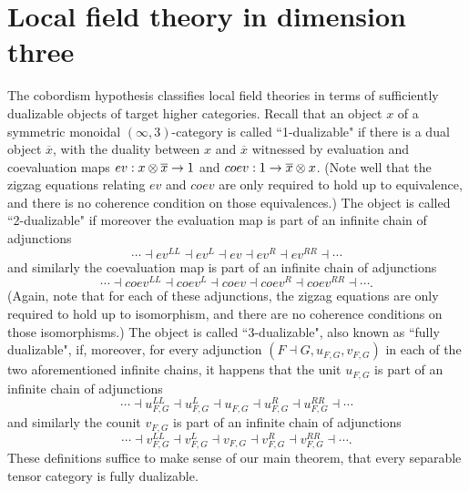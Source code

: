 \documentclass{amsart}
\begin{document}

\section{Local field theory in dimension three} \label{sec:lft}



The cobordism hypothesis \cite{MR1355899, lurie-ch} classifies local field theories in terms of sufficiently dualizable objects of target higher categories.  Recall that an object $x$ of a symmetric monoidal $(\infty,3)$-category is called ``1-dualizable" if there is a dual object $\overline{x}$, with the duality between $x$ and $\overline{x}$ witnessed by evaluation and coevaluation maps $ev: x \otimes \overline{x} \rightarrow 1$ and $coev: 1 \rightarrow \overline{x} \otimes x$.  (Note well that the zigzag equations relating $ev$ and $coev$ are only required to hold up to equivalence, and there is no coherence condition on those equivalences.)  The object is called ``2-dualizable" if moreover the evaluation map is part of an infinite chain of adjunctions 
$$\cdots \dashv ev^{LL} \dashv ev^L \dashv ev \dashv ev^R \dashv ev^{RR} \dashv \cdots$$
and similarly the coevaluation map is part of an infinite chain of adjunctions 
$$\cdots \dashv coev^{LL} \dashv coev^L \dashv coev \dashv coev^R \dashv coev^{RR} \dashv \cdots.$$  
(Again, note that for each of these adjunctions, the zigzag equations are only required to hold up to isomorphism, and there are no coherence conditions on those isomorphisms.)
The object is called ``3-dualizable", also known as ``fully dualizable", if, moreover, for every adjunction $(F \dashv G, u_{F,G}, v_{F,G})$ in each of the two aforementioned infinite chains, it happens that the unit $u_{F,G}$ is part of an infinite chain of adjunctions 
$$\cdots \dashv u_{F,G}^{LL} \dashv u_{F,G}^L \dashv u_{F,G} \dashv u_{F,G}^R \dashv u_{F,G}^{RR} \dashv \cdots$$ 
and similarly the counit $v_{F,G}$ is part of an infinite chain of adjunctions 
$$\cdots \dashv v_{F,G}^{LL} \dashv v_{F,G}^L \dashv v_{F,G} \dashv v_{F,G}^R \dashv v_{F,G}^{RR} \dashv \cdots.$$  These definitions suffice to make sense of our main theorem, that every separable tensor category is fully dualizable.  
\end{document}
